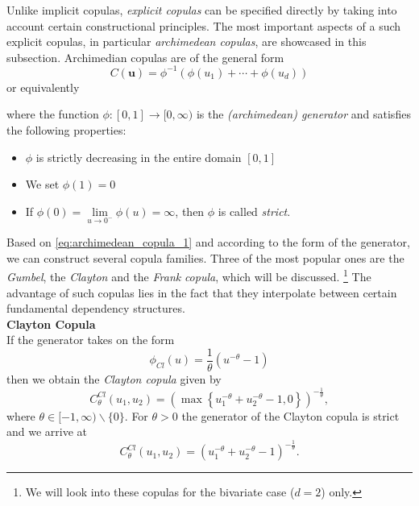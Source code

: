 
Unlike implicit copulas, \textit{explicit copulas} can be specified directly by taking into account certain constructional principles. The most important aspects of a such explicit copulas, in particular \textit{archimedean copulas}, are showcased in this subsection. Archimedian copulas are of the general form
\begin{equation}C(\boldsymbol{u})=\phi^{-1}\left(\phi\left(u_{1}\right)+\cdots+\phi\left(u_{d}\right)\right)
\label{eq:archimedean_copula_1}
\end{equation}
or equivalently

where the function $\phi:[0,1] \rightarrow [0, \infty)$ is the \textit{(archimedean) generator} and satisfies the following properties:
\begin{itemize}
\item $\phi$ is strictly decreasing in the entire domain $[0, 1]$
\item We set $\phi (1) = 0$
\item If  $\phi(0)=\lim \limits _{u \rightarrow 0^{-}} \phi(u)= \infty$, then $\phi$ is called \textit{strict}.
\end{itemize}
Based on \autoref{eq:archimedean_copula_1} and according to the form of the generator, we can construct several copula families. Three of the most popular ones are the \textit{Gumbel}, the \textit{Clayton} and the \textit{Frank} \textit{copula}, which will be discussed. \footnote{We will look into these copulas for the bivariate case ($d=2$) only.} The advantage of such copulas lies in the fact that they interpolate between certain fundamental dependency structures.\\

\textbf{Clayton Copula}\\
If the generator takes on the form
\begin{equation}
\phi_{C l}(u)=\frac{1}{\theta}\left(u^{-\theta}-1\right)
\end{equation}
then we obtain the \textit{Clayton copula} given by
\begin{equation}
C_{\theta}^{C l}\left(u_{1}, u_{2}\right)=\left(\max \left\{u_{1}^{-\theta}+u_{2}^{-\theta}-1,0\right\}\right)^{-\frac{1}{\theta}},
\end{equation}
where $\theta \in[-1, \infty) \backslash\{0\}$.
For $\theta > 0$ the generator of the Clayton copula is strict and we arrive at 
\begin{equation}
C_{\theta}^{C l}\left(u_{1}, u_{2}\right)= (u_{1}^{-\theta}+u_{2}^{-\theta}-1)^{-\frac{1}{\theta}}.
\end{equation}

